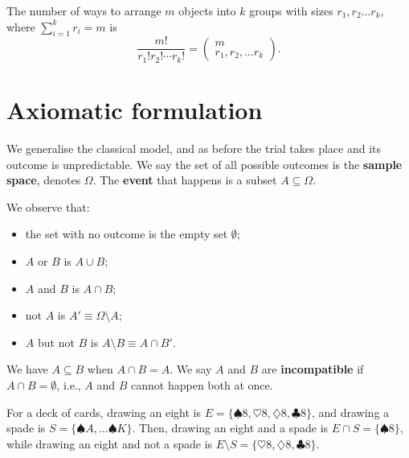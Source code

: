 \documentclass[letter-paper]{tufte-book}
\newenvironment{example}[1][Example]{\begin{trivlist}
\item[\hskip \labelsep {\bfseries #1}]}{\end{trivlist}}
\newcommand\Def[1]{\textbf{#1}}
\begin{document}
The number of ways to arrange $m$ objects into $k$ groups with sizes
$r_1,r_2\ldots r_k$, where $\sum_{i=1}^k r_i = m$ is
\begin{equation*}
  \frac{m!}{r_1!r_2!\cdots r_k!}=\begin{pmatrix}
  m\\ r_1,r_2,\ldots r_k\end{pmatrix}.
\end{equation*}


\section{Axiomatic formulation}

We generalise the classical model, and as before the trial takes place and its
outcome is unpredictable. We say the set of all possible outcomes is the
\Def{sample space}, denotes $\Omega$. The \Def{event} that happens
is a subset $A\subseteq\Omega$.

We observe that:
\begin{itemize}
  \item the set with no outcome is the empty set $\emptyset$;
  \item $A$ or $B$ is $A\cup B$;
  \item $A$ and $B$ is $A\cap B$;
  \item not $A$ is $A'\equiv \Omega\setminus A$;
  \item $A$ but not $B$ is $A\setminus B\equiv A\cap B'$.
\end{itemize}
We have $A\subseteq B$ when $A\cap B=A$. We say $A$ and $B$ are
\Def{incompatible} if $A\cap B=\emptyset$, i.e., $A$ and $B$ cannot happen
both at once.
\begin{example}
  For a deck of cards, drawing an eight is $E=\{\spadesuit8, \heartsuit8,
  \diamondsuit8, \clubsuit8\}$, and drawing a spade is $S=\{\spadesuit
  A,\ldots\spadesuit K\}$. Then, drawing an eight and a spade is $E\cap
  S=\{\spadesuit 8\}$, while drawing an eight and not a spade is $E\setminus
  S=\{\heartsuit8, \diamondsuit8, \clubsuit8\}$.
\end{example}
\end{document}
